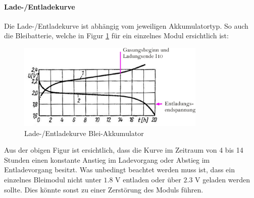 \newpage

\paragraph{Lade-/Entladekurve}
Die Lade-/Entladekurve ist abhängig vom jeweiligen Akkumulatortyp. So auch die Bleibatterie, welche in Figur \ref{fig:pb_akku_kurve} für ein einzelnes Modul ersichtlich ist:

\begin{figure}[h!]
	\centering
		\includegraphics[width=0.8\textwidth]{images/pb_akku_kurve.jpg}
	\caption{Lade-/Entladekurve Blei-Akkumulator \cite{pb_akku_kurve}}
	\label{fig:pb_akku_kurve}
\end{figure}

Aus der obigen Figur ist ersichtlich, dass die Kurve im Zeitraum von 4 bis 14 Stunden einen konstante Anstieg im Ladevorgang oder Abstieg im Entladevorgang besitzt. Was unbedingt beachtet werden muss ist, dass ein einzelnes Bleimodul nicht unter $1.8$ V entladen oder über $2.3$ V geladen werden sollte. Dies könnte sonst zu einer Zerstörung des Moduls führen.

\newpage